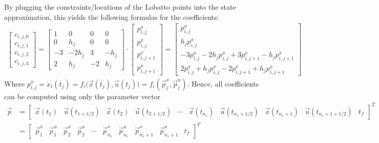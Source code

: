 				By plugging the constraints/locations of the Lobatto points into the state approximation, this yields the following formulas for the coefficients:
				\begin{align*}
					\begin{bmatrix}
						c_{i, j, 0} \\
						c_{i, j, 1} \\
						c_{i, j, 2} \\
						c_{i, j, 3}
					\end{bmatrix}
					=
					\begin{bmatrix}
						1  & 0     & 0  & 0    \\
						0  & h_j   & 0  & 0    \\
						-3 & -2h_j & 3  & -h_j \\
						2  & h_j   & -2 & h_j
					\end{bmatrix}
					\cdot
					\begin{bmatrix}
						p_{i, j}^x \\
						p_{i, j}^{\dot{x}} \\
						p_{i, j + 1}^{x} \\
						p_{i, j + 1}^{\dot{x}}
					\end{bmatrix}
					=
					\begin{bmatrix}
						p_{i, j}^x \\
						h_j p_{i, j}^{\dot{x}} \\
						-3 p_{i, j}^x - 2h_j p_{i, j}^{\dot{x}} + 3 p_{i, j + 1}^{x} - h_j p_{i, j + 1}^{\dot{x}} \\
						2 p_{i, j}^x + h_j p_{i, j}^{\dot{x}} - 2 p_{i, j + 1}^{x} + h_j p_{i, j + 1}^{\dot{x}}
					\end{bmatrix}
				\end{align*}
				Where \( p_{i, j}^{\dot{x}} = \dot{x}_i(t_j) = f_i\big(\vec{x}(t_j), \vec{u}(t_j)\big) = f_i(\vec{p}_j^x, \vec{p}_j^u) \). Hence, all coefficients can be computed using only the parameter vector
				\begin{align*}
					\vec{p}
						&= \begin{bmatrix} \vec{x}(t_1) & \vec{u}(t_{1 + 1/2}) & \vec{x}(t_2) & \vec{u}(t_{2 + 1/2}) & \cdots & \vec{x}(t_{n_s}) & \vec{u}(t_{n_s + 1/2}) & \vec{x}(t_{n_s + 1}) & \vec{u}(t_{n_s + 1 + 1/2}) & t_f \end{bmatrix}^T \\
						&= \begin{bmatrix} \vec{p}_1^x & \vec{p}_1^u & \vec{p}_2^x  & \vec{p}_2^u & \cdots & \vec{p}_{n_s}^x & \vec{p}_{n_s}^u & \vec{p}_{n_s + 1}^x & \vec{p}_{n_s + 1}^u & t_f \end{bmatrix}^T
				\end{align*}
